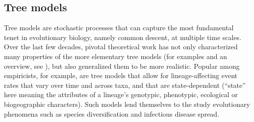 \documentclass[oneside]{article}
\begin{document}



\subsection*{Tree models}

Tree models are stochastic processes that can capture the most fundamental tenet in evolutionary biology, namely common descent, at multiple time scales.
Over the last few decades, pivotal theoretical work has not only characterized many properties of the more elementary tree models (for examples and an overview, see \citealp{nee06,wakeley09,stadler13b,harmon18}), but also generalized them to be more realistic.
Popular among empiricists, for example, are tree models that allow for lineage-affecting event rates that vary over time and across taxa, and that are state-dependent (``state'' here meaning the attributes of a lineage's genotypic, phenotypic, ecological or biogeographic characters).
Such models lend themselves to the study evolutionary phenomena such as species diversification and infectious disease spread.
\end{document}
